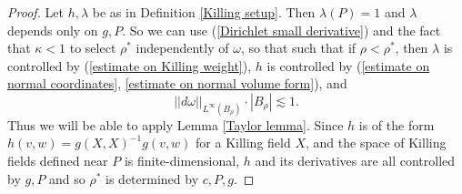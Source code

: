 \begin{proof}
Let $h,\lambda$ be as in Definition \ref{Killing setup}.
Then $\lambda(P) = 1$ and $\lambda$ depends only on $g,P$.
So we can use (\ref{Dirichlet small derivative}) and the fact that $\kappa < 1$ to select $\rho^*$ independently of $\omega$, so that such that
if $\rho < \rho^*$, then $\lambda$ is controlled by (\ref{estimate on Killing weight}),
$h$ is controlled by (\ref{estimate on normal coordinates}, \ref{estimate on normal volume form}), and
$$||d\omega||_{L^\infty(B_\rho)} \cdot |B_\rho| \lesssim 1.$$
Thus we will be able to apply Lemma \ref{Taylor lemma}.
Since $h$ is of the form $h(v, w) = g(X, X)^{-1} g(v, w)$ for a Killing field $X$, and the space of Killing fields defined near $P$ is finite-dimensional, $h$ and its derivatives are all controlled by $g,P$ and so $\rho^*$ is determined by $c,P,g$.


\end{proof}
